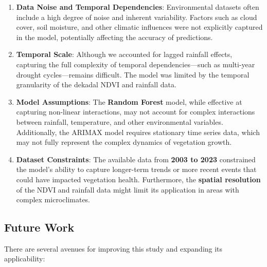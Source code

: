 \documentclass[
]{article}
\begin{document}
\begin{enumerate}
\def\labelenumi{\arabic{enumi}.}
\item
  \textbf{Data Noise and Temporal Dependencies}: Environmental datasets
  often include a high degree of noise and inherent variability. Factors
  such as cloud cover, soil moisture, and other climatic influences were
  not explicitly captured in the model, potentially affecting the
  accuracy of predictions.
\item
  \textbf{Temporal Scale}: Although we accounted for lagged rainfall
  effects, capturing the full complexity of temporal dependencies---such
  as multi-year drought cycles---remains difficult. The model was
  limited by the temporal granularity of the dekadal NDVI and rainfall
  data.
\item
  \textbf{Model Assumptions}: The \textbf{Random Forest} model, while
  effective at capturing non-linear interactions, may not account for
  complex interactions between rainfall, temperature, and other
  environmental variables. Additionally, the ARIMAX model requires
  stationary time series data, which may not fully represent the complex
  dynamics of vegetation growth.
\item
  \textbf{Dataset Constraints}: The available data from \textbf{2003 to
  2023} constrained the model's ability to capture longer-term trends or
  more recent events that could have impacted vegetation health.
  Furthermore, the \textbf{spatial resolution} of the NDVI and rainfall
  data might limit its application in areas with complex microclimates.
\end{enumerate}

\subsection{Future Work}\label{future-work}

There are several avenues for improving this study and expanding its
applicability:
\end{document}
